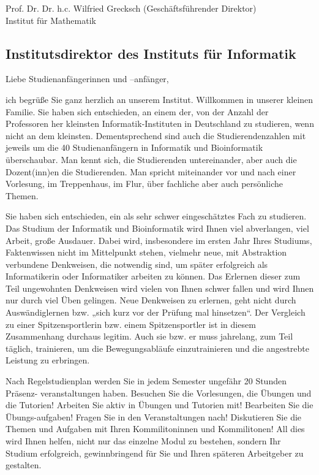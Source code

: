 Prof. Dr. Dr. h.c. Wilfried Grecksch (Geschäftsführender Direktor)\\
Institut für Mathematik
    

\subsection{Institutsdirektor des Instituts für Informatik}

Liebe Studienanfängerinnen und –anfänger,

ich begrüße Sie ganz herzlich an unserem Institut. Willkommen in unserer kleinen Familie. Sie haben sich entschieden, an einem der, von der Anzahl der Professoren her  kleinsten Informatik-Instituten in Deutschland zu studieren, wenn nicht an dem kleinsten. Dementsprechend sind auch die Studierendenzahlen mit jeweils um die 40 Studienanfängern in Informatik und Bioinformatik überschaubar. Man kennt sich, die Studierenden untereinander, aber auch die Dozent(inn)en die Studierenden. Man spricht miteinander vor und nach einer Vorlesung, im Treppenhaus, im Flur, über fachliche aber auch persönliche Themen.
 
Sie haben sich entschieden, ein als sehr schwer eingeschätztes Fach zu studieren. Das Studium der Informatik und Bioinformatik wird Ihnen viel abverlangen, viel Arbeit, große Ausdauer. Dabei wird, insbesondere im ersten Jahr Ihres Studiums, Faktenwissen nicht im Mittelpunkt stehen, vielmehr neue, mit Ab­straktion verbundene Denkweisen, die notwendig sind, um später erfolgreich als Informatikerin oder Informatiker arbeiten zu können. Das Erlernen dieser zum Teil ungewohnten Denkweisen wird vielen von Ihnen schwer fallen und wird Ihnen nur durch viel Üben gelingen. Neue Denkweisen zu erlernen, geht nicht durch Auswändiglernen bzw. „sich kurz vor der Prüfung mal hinsetzen“. Der Vergleich zu einer Spitzensportlerin bzw. einem Spitzensportler ist in diesem Zusammenhang durchaus legitim. Auch sie bzw. er muss jahrelang, zum Teil täglich, trainieren, um die Bewegungsabläufe einzutrainieren und die angestrebte Leistung zu erbringen.

Nach Regelstudienplan werden Sie in jedem Semester ungefähr 20 Stunden Präsenz- veranstaltungen haben. Besuchen Sie die Vorlesungen, die Übungen und die Tutorien! Arbeiten Sie aktiv in Übungen und Tutorien mit! Bearbeiten Sie die Übungs-aufgaben! Fragen Sie in den Veranstaltungen nach! Diskutieren Sie die Themen und Aufgaben mit Ihren Kommilitoninnen und Kommilitonen! All dies wird Ihnen helfen, nicht nur das einzelne Modul zu bestehen, sondern Ihr Studium erfolgreich, gewinnbringend für Sie und Ihren späteren Arbeitgeber zu gestalten. 

